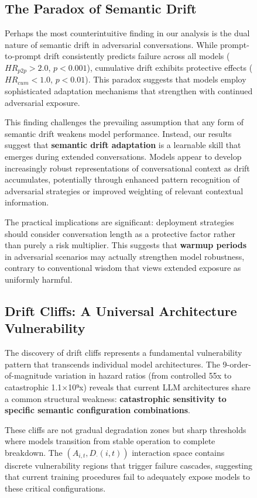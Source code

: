 \documentclass[letterpaper]{article}
\begin{document}
\begin{figure}[ht]
\subsection{The Paradox of Semantic Drift}

Perhaps the most counterintuitive finding in our analysis is the dual nature of semantic drift in adversarial conversations. While prompt-to-prompt drift consistently predicts failure across all models ($HR_{p2p} > 2.0$, $p < 0.001$), cumulative drift exhibits protective effects ($HR_{cum} < 1.0$, $p < 0.01$). This paradox suggests that models employ sophisticated adaptation mechanisms that strengthen with continued adversarial exposure.

This finding challenges the prevailing assumption that any form of semantic drift weakens model performance. Instead, our results suggest that \textbf{semantic drift adaptation} is a learnable skill that emerges during extended conversations. Models appear to develop increasingly robust representations of conversational context as drift accumulates, potentially through enhanced pattern recognition of adversarial strategies or improved weighting of relevant contextual information.

The practical implications are significant: deployment strategies should consider conversation length as a protective factor rather than purely a risk multiplier. This suggests that \textbf{warmup periods} in adversarial scenarios may actually strengthen model robustness, contrary to conventional wisdom that views extended exposure as uniformly harmful.

\subsection{Drift Cliffs: A Universal Architecture Vulnerability}

The discovery of drift cliffs represents a fundamental vulnerability pattern that transcends individual model architectures. The 9-order-of-magnitude variation in hazard ratios (from controlled 55x to catastrophic 1.1×10⁹x) reveals that current LLM architectures share a common structural weakness: \textbf{catastrophic sensitivity to specific semantic configuration combinations}.

These cliffs are not gradual degradation zones but sharp thresholds where models transition from stable operation to complete breakdown. The $(A_{i,t}, D_{\cdot}(i,t))$ interaction space contains discrete vulnerability regions that trigger failure cascades, suggesting that current training procedures fail to adequately expose models to these critical configurations.


\end{figure}
\end{document}

